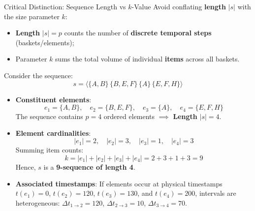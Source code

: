 \begin{alertblock}{Critical Distinction: Sequence Length vs $k$-Value}
    Avoid conflating \textbf{length} $|s|$ with the size parameter \textbf{$k$}:
    \begin{itemize}[noitemsep]
        \item \textbf{Length} $|s| = p$ counts the number of \textbf{discrete temporal steps} (baskets/elements);
        \item Parameter \textbf{$k$} sums the total volume of individual \textbf{items} across all baskets.
    \end{itemize}
\end{alertblock}

\begin{example}
Consider the sequence:
\begin{equation}
\label{eq:seq-example-calc-en}
s = \langle \{A, B\} \, \{B, E, F\} \, \{A\} \, \{E, F, H\} \rangle
\end{equation}
\begin{itemize}
    \item \textbf{Constituent elements}:
    \begin{equation*}
    e_1 = \{A, B\}, \quad e_2 = \{B, E, F\}, \quad e_3 = \{A\}, \quad e_4 = \{E, F, H\}
    \end{equation*}
    The sequence contains $p = 4$ ordered elements $\implies$ \textbf{Length} $|s| = 4$.
    \item \textbf{Element cardinalities}:
    \begin{equation*}
    |e_1| = 2, \quad |e_2| = 3, \quad |e_3| = 1, \quad |e_4| = 3
    \end{equation*}
    Summing item counts:
    \begin{equation*}
    k = |e_1| + |e_2| + |e_3| + |e_4| = 2 + 3 + 1 + 3 = 9
    \end{equation*}
    Hence, $s$ is a \textbf{9-sequence of length 4}.
    \item \textbf{Associated timestamps}:
    If elements occur at physical timestamps $t(e_1) = 0$, $t(e_2) = 120$, $t(e_3) = 130$, and $t(e_4) = 200$, intervals are heterogeneous: $\Delta t_{1 \to 2} = 120$, $\Delta t_{2 \to 3} = 10$, $\Delta t_{3 \to 4} = 70$.
\end{itemize}
\end{example}

